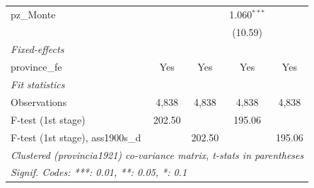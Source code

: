 \begin{table}[htbp]
\begin{tabular}{lcccc}
      pz\_Monte                        &                       &                               & 1.060$^{***}$        &   \\   
                                       &                       &                               & (10.59)              &   \\   
      \midrule
      \emph{Fixed-effects}\\
      province\_fe                     & Yes                   & Yes                           & Yes                  & Yes\\  
      \midrule
      \emph{Fit statistics}\\
      Observations                     & 4,838                 & 4,838                         & 4,838                & 4,838\\  
      F-test (1st stage)               & 202.50                &                               & 195.06               & \\  
      F-test (1st stage), ass1900s\_d  &                       & 202.50                        &                      & 195.06\\  
      \midrule \midrule
      \multicolumn{5}{l}{\emph{Clustered (provincia1921) co-variance matrix, t-stats in parentheses}}\\
      \multicolumn{5}{l}{\emph{Signif. Codes: ***: 0.01, **: 0.05, *: 0.1}}\\
   \end{tabular}
\end{table}


